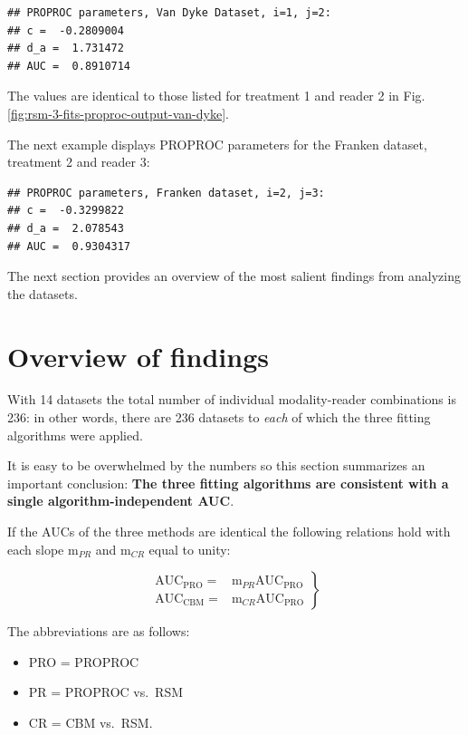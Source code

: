 \documentclass[
]{book}
\providecommand{\tightlist}{%
  \setlength{\itemsep}{0pt}\setlength{\parskip}{0pt}}
\begin{document}
\begin{verbatim}
## PROPROC parameters, Van Dyke Dataset, i=1, j=2: 
## c =  -0.2809004 
## d_a =  1.731472 
## AUC =  0.8910714
\end{verbatim}

The values are identical to those listed for treatment 1 and reader 2 in Fig. \ref{fig:rsm-3-fits-proproc-output-van-dyke}.

The next example displays PROPROC parameters for the Franken dataset, treatment 2 and reader 3:

\begin{verbatim}
## PROPROC parameters, Franken dataset, i=2, j=3: 
## c =  -0.3299822 
## d_a =  2.078543 
## AUC =  0.9304317
\end{verbatim}

The next section provides an overview of the most salient findings from analyzing the datasets.

\hypertarget{rsm-3-fits-overview}{%
\section{Overview of findings}\label{rsm-3-fits-overview}}

With 14 datasets the total number of individual modality-reader combinations is 236: in other words, there are 236 datasets to \emph{each} of which the three fitting algorithms were applied.

It is easy to be overwhelmed by the numbers so this section summarizes an important conclusion: \textbf{The three fitting algorithms are consistent with a single algorithm-independent AUC}.

If the AUCs of the three methods are identical the following relations hold with each slope \(\text{m}_{PR}\) and \(\text{m}_{CR}\) equal to unity:

\begin{equation}
\left. 
\begin{aligned}
\text{AUC}_{\text{PRO}} =& \text{m}_{PR} \text{AUC}_{\text{PRO}}  \\
\text{AUC}_{\text{CBM}} =& \text{m}_{CR} \text{AUC}_{\text{PRO}}
\end{aligned}
\right \}
\label{eq:rsm-3-fits-slopes-equation1}
\end{equation}

The abbreviations are as follows:

\begin{itemize}
\tightlist
\item
  PRO = PROPROC
\item
  PR = PROPROC vs.~RSM
\item
  CR = CBM vs.~RSM.
\end{itemize}
\end{document}
